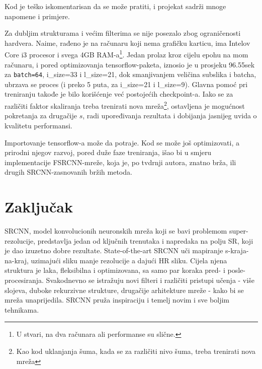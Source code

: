 \documentclass[12pt]{report}
\numberwithin{equation}{section}
\begin{document}
   Kod je teško iskomentarisan da se može pratiti, i projekat sadrži mnoge napomene i primjere.
  
   Za dubljim strukturama i većim filterima se nije posezalo zbog ograničenosti hardvera. Naime, rađeno je na računaru koji nema grafičku karticu, ima Intelov Core i3 procesor i svega 4GB RAM-a\footnote{U stvari, na dva računara ali performanse su slične.}. Jedan prolaz kroz cijelu epohu na mom računaru, i pored optimizovanja tensorflow-paketa, iznosio je u prosjeku 96.55sek za \texttt{batch=64}, i\_size=33 i l\_size=21, dok smanjivanjem veličina subslika i batcha, ubrzava se proces (i preko 5 puta, za i\_size=21 i l\_size=9). Glavna pomoć pri treniranju takođe je bilo korišćenje već postojećih checkpoint-a. Iako se za različiti faktor skaliranja treba trenirati nova mreža\footnote{Kao kod uklanjanja šuma, kada se za različiti nivo šuma, treba trenirati nova mreža}, ostavljena je mogućnost pokretanja za drugačije $s$, radi upoređivanja rezultata i dobijanja jasnijeg uvida o kvalitetu performansi. 
  
 Importovanje tensorflow-a može da potraje. Kod se može još optimizovati, a prirodni njegov razvoj, pored duže faze treniranja, išao bi u smjeru implementacije FSRCNN-mreže, koja je, po tvdrnji autora, znatno brža, ili drugih SRCNN-zasnovanih bržih metoda. 

  
  
 
    


\chapter{Zaključak}\label{ch2}  
  

  SRCNN, model konvolucionih neuronskih mreža koji se bavi problemom super-rezolucije, predstavlja jedan od ključnih trenutaka i napredaka na polju SR, koji je dao izuzetno dobre rezultate. State-of-the-art SRCNN uči mapiranje s-kraja-na-kraj, uzimajući sliku manje rezolucije a dajući HR sliku. Cijela njena struktura je laka, fleksibilna i optimizovana, sa samo par koraka pred- i posle-procesiranja. Svakodnevno se istražuju novi filteri i različiti pristupi učenja - više slojeva, duboke rekurzivne strukture, drugačije arhitekture mreže - kako bi se mreža unaprijedila. SRCNN pruža inspiraciju i temelj novim i sve boljim tehnikama.
 
\end{document}
